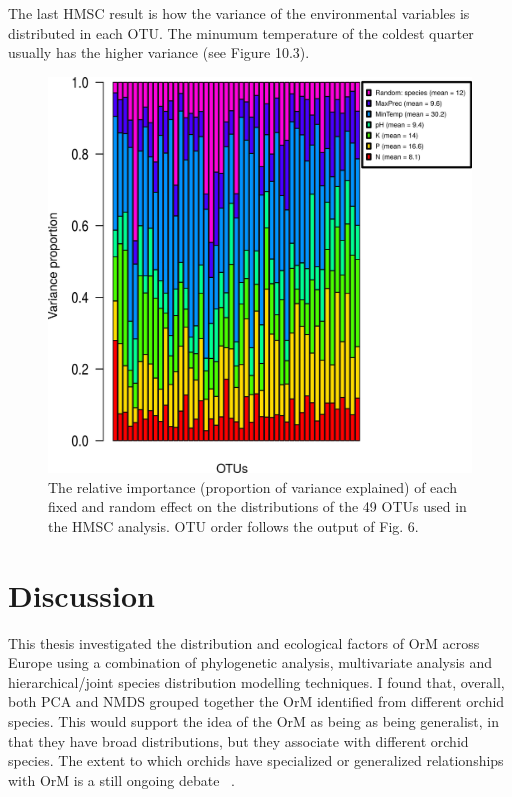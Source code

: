 The last HMSC result is how the variance of the environmental variables is distributed in each OTU. The minumum temperature of the coldest quarter usually has the higher variance (see Figure 10.3).

\begin{figure}[htbp]
\centering
\includegraphics[keepaspectratio,width=\textwidth,height=0.75\textheight]{images/varDistribution00.png}
\caption{The relative importance (proportion of variance explained) of each fixed and random effect on the distributions of the 49 OTUs used in the HMSC analysis. OTU order follows the output of Fig. 6.}
\end{figure}

\part{Discussion}
\label{discussion}

This thesis investigated the distribution and ecological factors of OrM across Europe using a combination of phylogenetic analysis, multivariate analysis and hierarchical\slash joint species distribution modelling techniques. I found that, overall, both PCA and NMDS grouped together the OrM identified from different orchid species. This would support the idea of the OrM as being as being generalist, in that they have broad distributions, but they associate with different orchid species. The extent to which orchids have specialized or generalized relationships with OrM is a still ongoing debate ~\citep{bailarote2012}.

